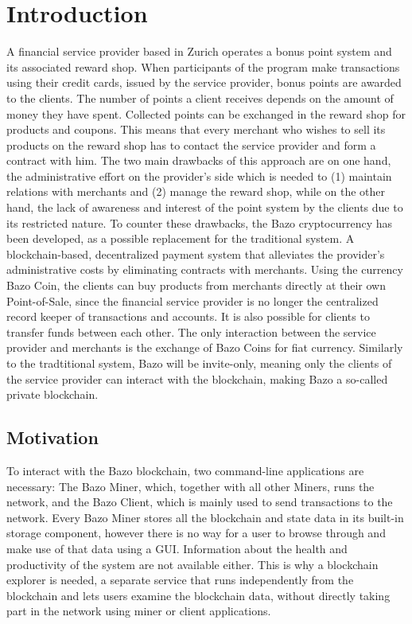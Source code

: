 \chapter{Introduction}
A financial service provider based in Zurich operates a bonus point system and its associated reward shop. When participants of the program make transactions using their credit cards, issued by the service provider, bonus points are awarded to the clients. The number of points a client receives depends on the amount of money they have spent. Collected points can be exchanged in the reward shop for products and coupons. This means that every merchant who wishes to sell its products on the reward shop has to contact the service provider and form a contract with him. The two main drawbacks of this approach are on one hand, the administrative effort on the provider's side which is needed to (1) maintain relations with merchants and (2) manage the reward shop, while on the other hand, the lack of awareness and interest of the point system by the clients due to its restricted nature.
To counter these drawbacks, the Bazo cryptocurrency has been developed, as a possible replacement for the traditional system. A blockchain-based, decentralized payment system that alleviates the provider's administrative costs by eliminating contracts with merchants. Using the currency Bazo Coin, the clients can buy products from merchants directly at their own Point-of-Sale, since the financial service provider is no longer the centralized record keeper of transactions and accounts. It is also possible for clients to transfer funds between each other. The only interaction between the service provider and merchants is the exchange of Bazo Coins for fiat currency. Similarly to the tradtitional system, Bazo will be invite-only, meaning only the clients of the service provider can interact with the blockchain, making Bazo a so-called private blockchain.

\section{Motivation}
To interact with the Bazo blockchain, two command-line applications are necessary: The Bazo Miner, which, together with all other Miners, runs the network, and the Bazo Client, which is mainly used to send transactions to the network. Every Bazo Miner stores all the blockchain and state data in its built-in storage component, however there is no way for a user to browse through and make use of that data using a GUI. Information about the health and productivity of the system are not available either. This is why a blockchain explorer is needed, a separate service that runs independently from the blockchain and lets users examine the blockchain data, without directly taking part in the network using miner or client applications.

